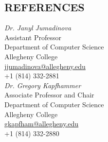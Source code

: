 \documentclass[margin]{res}
\begin{document}
\begin{resume}
\section{REFERENCES}
{\sl Dr. Janyl Jumadinova} \hfill \\
Assistant Professor \\ Department of Computer Science \\ Allegheny College \\
\url{jjumadinova@allegheny.edu} \\
+1 (814) 332-2881 \\

{\sl Dr. Gregory Kapfhammer} \hfill \\
Associate Professor and Chair \\ Department of Computer Science \\ Allegheny College \\
\url{gkapfham@allegheny.edu} \\
+1 (814) 332-2880\\
%


\end{resume}
\end{document}
